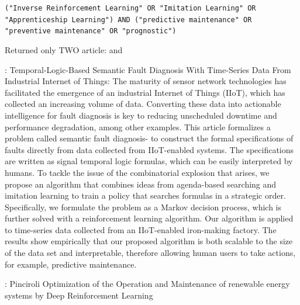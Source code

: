 \documentclass{article}
\begin{document}
\texttt{("Inverse Reinforcement Learning" OR "Imitation Learning" OR "Apprenticeship Learning") AND ("predictive maintenance" OR "preventive maintenance" OR "prognostic")}

Returned only TWO article: \cite{Chen-2021-Temporal} and \cite{Pinciroli2022-752} 	

\cite{Chen-2021-Temporal}: Temporal-Logic-Based Semantic Fault Diagnosis With Time-Series Data From Industrial Internet of Things:
The maturity of sensor network technologies has facilitated the emergence of an industrial Internet of Things (IIoT), which has collected an increasing volume of data. Converting these data into actionable intelligence for fault diagnosis is key to reducing unscheduled downtime and performance degradation, among other examples. This article formalizes a problem called semantic fault diagnosis- to construct the formal specifications of faults directly from data collected from IIoT-enabled systems. The specifications are written as signal temporal logic formulas, which can be easily interpreted by humans. To tackle the issue of the combinatorial explosion that arises, we propose an algorithm that combines ideas from agenda-based searching and imitation learning to train a policy that searches formulas in a strategic order. Specifically, we formulate the problem as a Markov decision process, which is further solved with a reinforcement learning algorithm. Our algorithm is applied to time-series data collected from an IIoT-enabled iron-making factory. The results show empirically that our proposed algorithm is both scalable to the size of the data set and interpretable, therefore allowing human users to take actions, for example, predictive maintenance.

\cite{Pinciroli2022-752}: Pinciroli Optimization of the Operation and Maintenance of renewable energy systems by Deep Reinforcement Learning

\end{document}
